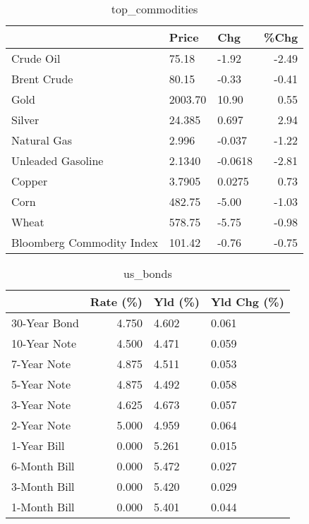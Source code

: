 \documentclass{article}%
\begin{document}
\begin{table}[htbp]%
\caption{top\_commodities}%
\centering%
\begin{adjustbox}{width=1\textwidth}%
\begin{tabular}{lllr}
\toprule
                          &   Price &     Chg &  \%Chg \\
\midrule
               Crude Oil  &   75.18 &   -1.92 & -2.49 \\
             Brent Crude  &   80.15 &   -0.33 & -0.41 \\
                    Gold  & 2003.70 &   10.90 &  0.55 \\
                  Silver  &  24.385 &   0.697 &  2.94 \\
             Natural Gas  &   2.996 &  -0.037 & -1.22 \\
       Unleaded Gasoline  &  2.1340 & -0.0618 & -2.81 \\
                  Copper  &  3.7905 &  0.0275 &  0.73 \\
                    Corn  &  482.75 &   -5.00 & -1.03 \\
                   Wheat  &  578.75 &   -5.75 & -0.98 \\
Bloomberg Commodity Index &  101.42 &   -0.76 & -0.75 \\
\bottomrule
\end{tabular}
%
\end{adjustbox}%
\end{table}

%


\begin{table}[htbp]%
\caption{us\_bonds}%
\centering%
\begin{adjustbox}{width=1\textwidth}%
\begin{tabular}{lrll}
\toprule
             &  Rate (\%) & Yld (\%) & Yld Chg (\%) \\
\midrule
30-Year Bond &     4.750 &   4.602 &       0.061 \\
10-Year Note &     4.500 &   4.471 &       0.059 \\
 7-Year Note &     4.875 &   4.511 &       0.053 \\
 5-Year Note &     4.875 &   4.492 &       0.058 \\
 3-Year Note &     4.625 &   4.673 &       0.057 \\
 2-Year Note &     5.000 &   4.959 &       0.064 \\
 1-Year Bill &     0.000 &   5.261 &       0.015 \\
6-Month Bill &     0.000 &   5.472 &       0.027 \\
3-Month Bill &     0.000 &   5.420 &       0.029 \\
1-Month Bill &     0.000 &   5.401 &       0.044 \\
\bottomrule
\end{tabular}
%
\end{adjustbox}%
\end{table}
\end{document}
